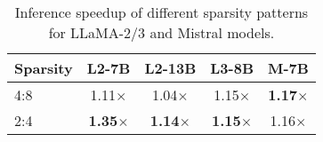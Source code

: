\begin{table}[h!]
\centering
    \fontsize{9.5}{11} \selectfont
    \begin{tabular}{lcccc}
    \toprule
    Sparsity & L2-7B & L2-13B & L3-8B & M-7B \\
    \hline
    4:8 & {1.11}$\times$ & 1.04$\times$ & 1.15$\times$ & \textbf{1.17}$\times$ \\
    2:4 & \textbf{1.35}$\times$ & \textbf{1.14}$\times$ & \textbf{1.15}$\times$ & 1.16$\times$ \\
    \bottomrule
    \end{tabular}
    \vspace{-3mm}
    \caption{Inference speedup of different sparsity patterns for LLaMA-2/3 and Mistral models.}
    \label{tab:infer-speed}
    \vspace{-5mm}
\end{table}

